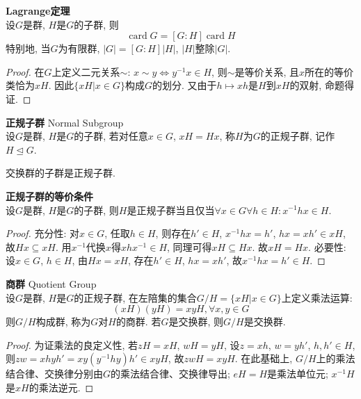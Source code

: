 \begin{thm}\textbf{Lagrange定理}\\
设$G$是群, $H$是$G$的子群, 则
\begin{equation}
    \operatorname{card}G=[G:H] \operatorname{card}H
\end{equation}
特别地, 当$G$为有限群, $|G|=[G:H]|H|$, $|H|$整除$|G|$.
\end{thm}
\begin{proof}
在$G$上定义二元关系$\sim$: $x\sim y \iff y^{-1}x\in H$, 则$\sim$是等价关系, 且$x$所在的等价类恰为$xH$. 因此$\{xH\vert x\in G\}$构成$G$的划分. 又由于$h\mapsto xh$是$H$到$xH$的双射, 命题得证.  
\end{proof}

\begin{dfn} \textbf{正规子群} Normal Subgroup\\
设$G$是群, $H$是$G$的子群, 若对任意$x\in G$, $xH=Hx$, 称$H$为$G$的正规子群, 记作$H\unlhd G$. 
\end{dfn}
交换群的子群是正规子群. 

\begin{pro}\textbf{正规子群的等价条件}\\
设$G$是群, $H$是$G$的子群, 则$H$是正规子群当且仅当$\forall x\in G \forall h \in H:x^{-1}hx\in H$. 
\end{pro}
\begin{proof}
充分性: 对$x\in G$, 任取$h\in H$, 则存在$h'\in H$, $x^{-1}hx=h'$, $hx = xh'\in xH$, 故$Hx\subseteq xH$. 用$x^{-1}$代换$x$得$xhx^{-1}\in H$, 同理可得$xH\subseteq Hx$. 故$xH=Hx$. 必要性: 设$x\in G$, $h\in H$, 由$Hx=xH$, 存在$h'\in H$, $hx=xh'$, 故$x^{-1}hx=h'\in H$. 
\end{proof}

\begin{pro} \textbf{商群} Quotient Group\\
设$G$是群, $H$是$G$的正规子群, 在左陪集的集合$G/H=\{xH\vert x\in G\}$上定义乘法运算:
\begin{equation}
    (xH)(yH) = xyH, \forall x,y \in G
\end{equation}
则$G/H$构成群, 称为$G$对$H$的商群. 若$G$是交换群, 则$G/H$是交换群. 
\end{pro}
\begin{proof}
为证乘法的良定义性, 若$zH=xH$, $wH=yH$, 设$z=xh$, $w=yh'$, $h,h'\in H$, 则$zw=xhyh' = xy(y^{-1}hy)h'\in xyH$, 故$zwH=xyH$. 在此基础上, $G/H$上的乘法结合律、交换律分别由$G$的乘法结合律、交换律导出; $eH=H$是乘法单位元; $x^{-1}H$是$xH$的乘法逆元. 
\end{proof}

